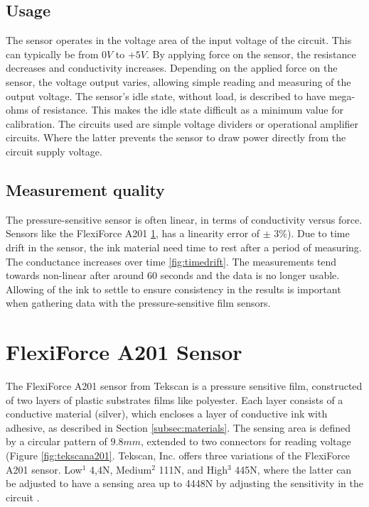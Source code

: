 \subsection{Usage}
The sensor operates in the voltage area of the input voltage of the circuit. This can typically be from $0V$ to $+5V$. By applying force on the sensor, the resistance decreases and conductivity increases. Depending on the applied force on the sensor, the voltage output varies, allowing simple reading and measuring of the output voltage. The sensor's idle state, without load, is described to have mega-ohms of resistance. This makes the idle state difficult as a minimum value for calibration.
The circuits used are simple voltage dividers or operational amplifier circuits. Where the latter prevents the sensor to draw power directly from the circuit supply voltage.

\subsection{Measurement quality}
The pressure-sensitive sensor is often linear, in terms of conductivity versus force. Sensors like the FlexiForce A201 \ref{sec:flexiforce}, has a linearity error of $\pm$ 3\%). Due to time drift in the sensor, the ink material need time to rest after a period of measuring. The conductance increases over time \ref{fig:timedrift}. The measurements tend towards non-linear after around 60 seconds and the data is no longer usable.
Allowing of the ink to settle to ensure consistency in the results is important when gathering data \citep{vecchi_experimental_2000} with the pressure-sensitive film sensors.

\section{FlexiForce A201 Sensor}
\label{sec:flexiforce}
The FlexiForce A201 sensor from Tekscan is a pressure sensitive film, constructed of two layers of plastic substrates films like polyester. Each layer consists of a conductive material (silver), which encloses a layer of conductive ink with adhesive, as described in Section \ref{subsec:materials}. The sensing area is defined by a circular pattern of $9.8mm$, extended to two connectors for reading voltage (Figure \ref{fig:tekscana201}. Tekscan, Inc. offers three variations of the FlexiForce A201 sensor. Low$^1$ 4,4\si{\newton}, Medium$^2$ 111\si{\newton}, and High$^3$ 445\si{\newton}, where the latter can be adjusted to have a sensing area up to 4448\si{\newton} by adjusting the sensitivity in the circuit \citep{tekscanA201}.


